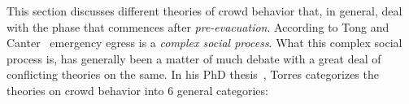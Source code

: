 
This section discusses different theories of crowd behavior that, in general, deal with the phase that commences after \emph{pre-evacuation}. According to Tong and Canter~\cite{Tong:1985wn} emergency egress is a \emph{complex social process}. What this complex social process is, has generally been a matter of much debate with a great deal of conflicting theories on the same. In his PhD thesis~\cite{Torres:2010tj}, Torres categorizes the theories on crowd behavior into 6 general categories:

